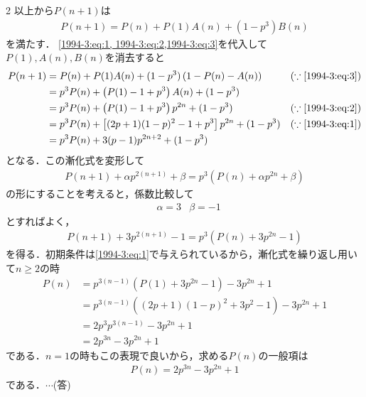 \documentclass[../../../../main.tex]{subfiles}
\begin{document}
\begin{multicols}{2}
  以上から$P(n+1)$は
  \begin{align}
    P(n+1) = P(n) + P(1)A(n) + (1-p^3) B(n)
  \end{align}
  を満たす．
  \cref{1994-3:eq:1, 1994-3:eq:2,1994-3:eq:3}を代入して$P(1),A(n),B(n)$を消去すると
  \begin{align}
    P(n+1)
     & = P(n) + P(1)A(n) + (1-p^3) \left(1-P(n)-A(n)\right)         & (\because \text{\cref{1994-3:eq:3}}) \\
     & = p^3P(n) + \left(P(1)-1+p^3\right)A(n) + (1-p^3)            &                                      \\
     & = p^3P(n) + \left(P(1)-1+p^3\right)p^{2n} + (1-p^3)          & (\because \text{\cref{1994-3:eq:2}}) \\
     & = p^3P(n) + \left[(2p+1)(1-p)^2-1+p^3\right]p^{2n} + (1-p^3) & (\because \text{\cref{1994-3:eq:1}}) \\
     & = p^3P(n) + 3(p-1)p^{2n+2} + (1-p^3)                         &                                      \\
  \end{align}
  となる．この漸化式を変形して
  \begin{align*}
    P(n+1) + \alpha p^{2(n+1)} + \beta = p^3\left(P(n)+\alpha p^{2n}+\beta \right)
  \end{align*}
  の形にすることを考えると，係数比較して
  \begin{align*}
     & \alpha= 3 & \beta = -1
  \end{align*}
  とすればよく，
  \begin{align*}
    P(n+1) + 3p^{2(n+1)} -1 = p^3\left(P(n)+ 3p^{2n}-1\right)
  \end{align*}
  を得る．初期条件は\cref{1994-3:eq:1}で与えられているから，漸化式を繰り返し用いて$n\ge 2$の時
  \begin{align*}
    P(n)
     & = p^{3(n-1)}\left(P(1)+ 3p^{2n}-1\right) - 3p^{2n} + 1         \\
     & = p^{3(n-1)}\left((2p+1)(1-p)^2+ 3p^{2}-1\right) - 3p^{2n} + 1 \\
     & = 2p^3p^{3(n-1)} - 3p^{2n} + 1                                 \\
     & = 2p^{3n} - 3p^{2n} + 1
  \end{align*}
  である．$n=1$の時もこの表現で良いから，求める$P(n)$の一般項は
  \begin{align*}
    P(n) = 2p^{3n} - 3p^{2n} + 1
  \end{align*}
  である．$\cdots$(答)
  \vspace{10pt}


\end{multicols}
\end{document}
